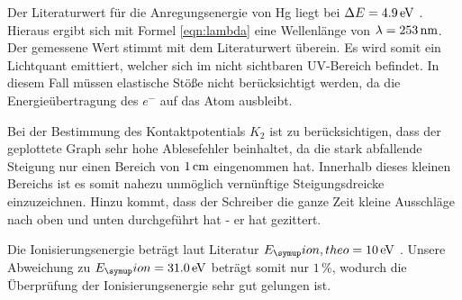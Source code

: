 Der Literaturwert für die Anregungsenergie von Hg liegt bei $\Delta E=4.9\,\si{\electronvolt}$
\cite{hg}. Hieraus ergibt sich mit Formel \eqref{eqn:lambda} eine Wellenlänge
von $\lambda=253\,\si{\nano\meter}$. Der gemessene Wert stimmt mit dem Literaturwert überein.
Es wird somit ein Lichtquant emittiert, welcher sich im nicht sichtbaren
UV-Bereich befindet.
In diesem Fall müssen elastische Stöße nicht berücksichtigt werden, da die
Energieübertragung des $e^-$ auf das Atom ausbleibt.

Bei der Bestimmung des Kontaktpotentials $K_2$ ist zu berücksichtigen, dass der
geplottete Graph sehr hohe Ablesefehler beinhaltet, da die stark abfallende Steigung
nur einen Bereich von $1\,\si{\centi\meter}$ eingenommen hat. Innerhalb dieses kleinen Bereichs
ist es somit nahezu unmöglich vernünftige Steigungsdreicke einzuzeichnen. Hinzu
kommt, dass der Schreiber die ganze Zeit kleine Ausschläge nach oben und unten
durchgeführt hat - er hat gezittert.

Die Ionisierungsenergie beträgt laut Literatur $E_\su{ion, theo} = 10\eV$ \cite{theo}.
Unsere Abweichung zu  $E_\su{ion} = 31.0\eV$ beträgt somit nur $1\,\%$, wodurch
die Überprüfung der Ionisierungsenergie sehr gut gelungen ist.
